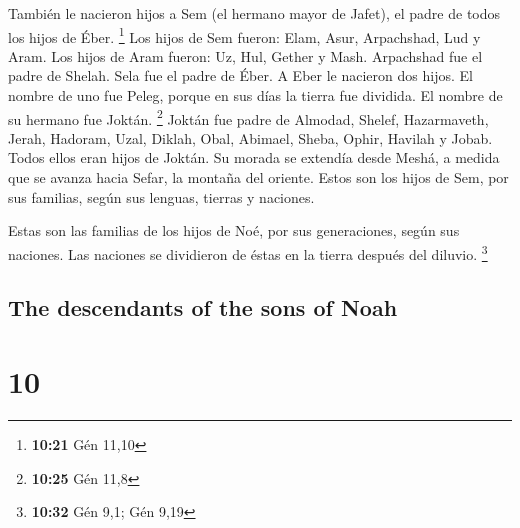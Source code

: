 \begin{paracol}{2}
 También le nacieron hijos a Sem (el hermano mayor de
Jafet), el padre de todos los hijos de Éber. \footnote{\textbf{10:21}
  Gén 11,10}  Los hijos de Sem fueron: Elam, Asur,
Arpachshad, Lud y Aram.  Los hijos de Aram fueron: Uz,
Hul, Gether y Mash.  Arpachshad fue el padre de Shelah.
Sela fue el padre de Éber.  A Eber le nacieron dos hijos.
El nombre de uno fue Peleg, porque en sus días la tierra fue dividida.
El nombre de su hermano fue Joktán. \footnote{\textbf{10:25} Gén 11,8}
 Joktán fue padre de Almodad, Shelef, Hazarmaveth, Jerah,
 Hadoram, Uzal, Diklah,  Obal, Abimael,
Sheba,  Ophir, Havilah y Jobab. Todos ellos eran hijos de
Joktán.  Su morada se extendía desde Meshá, a medida que
se avanza hacia Sefar, la montaña del oriente.  Estos son
los hijos de Sem, por sus familias, según sus lenguas, tierras y
naciones.

 Estas son las familias de los hijos de Noé, por sus
generaciones, según sus naciones. Las naciones se dividieron de éstas en
la tierra después del diluvio. \footnote{\textbf{10:32} Gén 9,1; Gén
  9,19}

\switchcolumn
\begin{otherlanguage}{english}

\hypertarget{the-descendants-of-the-sons-of-noah}{%
\subsection{The descendants of the sons of
Noah}\label{the-descendants-of-the-sons-of-noah}}

\hypertarget{section-19}{%
\section{10}\label{section-19}}


\end{otherlanguage}
\end{paracol}
